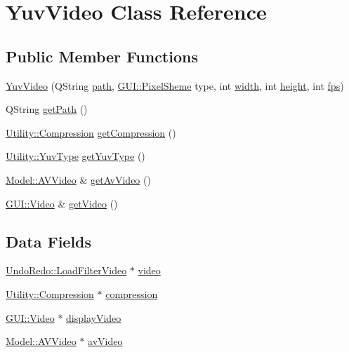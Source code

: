 \hypertarget{classModel_1_1YuvVideo}{}\section{Yuv\+Video Class Reference}
\label{classModel_1_1YuvVideo}
\subsection*{Public Member Functions}
\begin{DoxyCompactItemize}
\item 
\hyperlink{classModel_1_1YuvVideo_a988de98cc63509404457a7f63e3d14f4}{Yuv\+Video} (Q\+String \hyperlink{classModel_1_1YuvVideo_a34b772573db9a14b1acb61b24709ae73}{path}, \hyperlink{namespaceGUI_a52432774abcaf0c8c417ae77739fccfc}{G\+U\+I\+::\+Pixel\+Sheme} type, int \hyperlink{classModel_1_1YuvVideo_a2474a5474cbff19523a51eb1de01cda4}{width}, int \hyperlink{classModel_1_1YuvVideo_ad12fc34ce789bce6c8a05d8a17138534}{height}, int \hyperlink{classModel_1_1YuvVideo_a45b67662d620a977a2cfe519f7ab6273}{fps})
\item 
Q\+String \hyperlink{classModel_1_1YuvVideo_a1a94d0c9bf9dd725556721ac914025e3}{get\+Path} ()
\item 
\hyperlink{namespaceUtility_a56a83bf6847f4801f4205eb4be237ccf}{Utility\+::\+Compression} \hyperlink{classModel_1_1YuvVideo_a000ce702632feab3b3c87d4416f0b3d3}{get\+Compression} ()
\item 
\hyperlink{namespaceUtility_a390030b1bf5fed79ccf00774d4e1b5b1}{Utility\+::\+Yuv\+Type} \hyperlink{classModel_1_1YuvVideo_a2c9b431993b7616d4bd5a656b0053ac1}{get\+Yuv\+Type} ()
\item 
\hyperlink{classModel_1_1AVVideo}{Model\+::\+A\+V\+Video} \& \hyperlink{classModel_1_1YuvVideo_a58bd43e5cbaa711bf19b0c71efbc9834}{get\+Av\+Video} ()
\item 
\hyperlink{classGUI_1_1Video}{G\+U\+I\+::\+Video} \& \hyperlink{classModel_1_1YuvVideo_a98d400f18a58a86564ce1fb048bd5fad}{get\+Video} ()
\end{DoxyCompactItemize}
\subsection*{Data Fields}
\begin{DoxyCompactItemize}
\item 
\hyperlink{classUndoRedo_1_1LoadFilterVideo}{Undo\+Redo\+::\+Load\+Filter\+Video} $\ast$ \hyperlink{classModel_1_1YuvVideo_a589afbbb98d9ac668ed4261722ddb780}{video}
\item 
\hyperlink{namespaceUtility_a56a83bf6847f4801f4205eb4be237ccf}{Utility\+::\+Compression} $\ast$ \hyperlink{classModel_1_1YuvVideo_a5d1e07bb289f0da24eb98307615fa3f5}{compression}
\item 
\hyperlink{classGUI_1_1Video}{G\+U\+I\+::\+Video} $\ast$ \hyperlink{classModel_1_1YuvVideo_af8206df3707fca9fd439fd3ed73b6156}{display\+Video}
\item 
\hyperlink{classModel_1_1AVVideo}{Model\+::\+A\+V\+Video} $\ast$ \hyperlink{classModel_1_1YuvVideo_a270efc836b2d2c70aec72106128ff89f}{av\+Video}
\end{DoxyCompactItemize}
